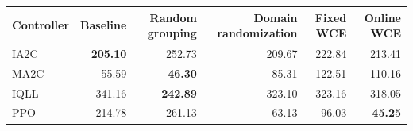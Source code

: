 \begin{tabular}{lrrrrr}
\hline
Controller & Baseline & Random grouping & Domain randomization & Fixed WCE & Online WCE \\
\hline
IA2C & \textbf{205.10} & 252.73 & 209.67 & 222.84 & 213.41 \\
MA2C & 55.59 & \textbf{46.30} & 85.31 & 122.51 & 110.16 \\
IQLL & 341.16 & \textbf{242.89} & 323.10 & 323.16 & 318.05 \\
PPO & 214.78 & 261.13 & 63.13 & 96.03 & \textbf{45.25} \\
\hline
\end{tabular}
